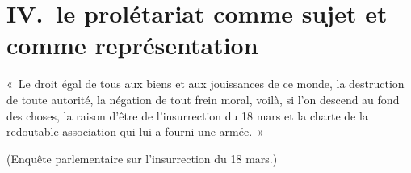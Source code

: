 \documentclass[french,twoside]{book} %
\newcommand{\bibl}[1]{{\smallskip\RaggedLeft\normalsize\normalfont #1\par\medskip}}}
\newenvironment{epigraph}{\begin{addmargin}[2\parindent]{0em}\sffamily\large\setstretch{0.95}}{\end{addmargin}\bigskip}
\newcommand\chapteropen{} %
\begin{document}
\chapteropen

\chapter[{IV. le prolétariat comme sujet et comme représentation}]{IV. le prolétariat comme sujet et comme représentation}
\renewcommand{\leftmark}{IV. le prolétariat comme sujet et comme représentation}


\begin{epigraph}
\noindent « Le droit égal de tous aux biens et aux jouissances de ce monde, la destruction de toute autorité, la négation de tout frein moral, voilà, si l’on descend au fond des choses, la raison d’être de l’insurrection du 18 mars et la charte de la redoutable association qui lui a fourni une armée. »\par

\bibl{(Enquête parlementaire sur l’insurrection du 18 mars.)}
\end{epigraph}
\end{document}
